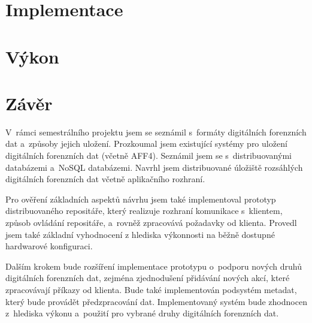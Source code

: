 \chapter{Implementace} \label{chapter_impl}

\chapter{Výkon} \label{chapter_performance}

\chapter{Závěr}
V~rámci semestrálního projektu jsem se seznámil s~formáty digitálních forenzních dat a~způsoby jejich uložení. Prozkoumal jsem existující systémy pro uložení digitálních forenzních dat (včetně AFF4). Seznámil jsem se s~distribuovanými databázemi a~NoSQL databázemi. Navrhl jsem distribuované úložiště rozsáhlých digitálních forenzních dat včetně aplikačního rozhraní.

Pro ověření základních aspektů návrhu jsem také implementoval prototyp distribuovaného repositáře, který realizuje rozhraní komunikace s~klientem, způsob ovládání repositáře, a~rovněž zpracovává požadavky od klienta. Provedl jsem také základní vyhodnocení z hlediska výkonnosti na běžně dostupné hardwarové konfiguraci.

Dalším krokem bude rozšíření implementace prototypu o~podporu nových druhů digitálních forenzních dat, zejména zjednodušení přidávání nových akcí, které zpracovávají příkazy od klienta. Bude také implementován podsystém metadat, který bude provádět předzpracování dat.
Implementovaný systém bude zhodnocen z~hlediska výkonu a~použití pro vybrané druhy digitálních forenzních dat.

